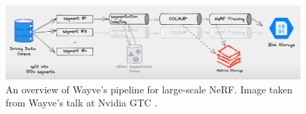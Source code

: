 \begin{figure}[!h]
    \centering
    \includegraphics[width=1.0\textwidth]{figures/wayve-pipeline.png}
    \caption[Wayve's large-scale NeRF pipeline]{An overview of Wayve's pipeline for large-scale NeRF. Image taken from Wayve's talk at Nvidia GTC \cite{sokolski2023building}.}
    \label{fig:wayve-pipeline}
\end{figure}